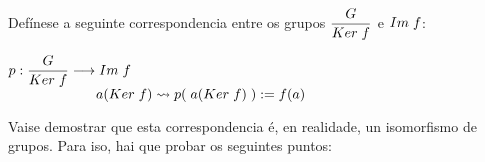 \documentclass[twoside]{report}
\theoremstyle{mystyle}
\begin{document}
\noindent Defínese a seguinte correspondencia entre os grupos $\displaystyle \frac{G}{Ker \hspace{1mm} f}$ e $Im \hspace{1mm} f$: 

    \begin{center}
        $p: \displaystyle \frac{G}{Ker \hspace{1mm} f} \longrightarrow Im \hspace{1mm} f$ \\
        \vspace{2mm}
        $\hspace{22mm} a(Ker \hspace{1mm} f) \leadsto p(\hspace{1mm}a(Ker \hspace{1mm} f)\hspace{1mm}) := f(a)$
    \end{center} 
    
\noindent Vaise demostrar que esta correspondencia é, en realidade, un isomorfismo de grupos. Para iso, hai que probar os seguintes puntos: 
\end{document}
